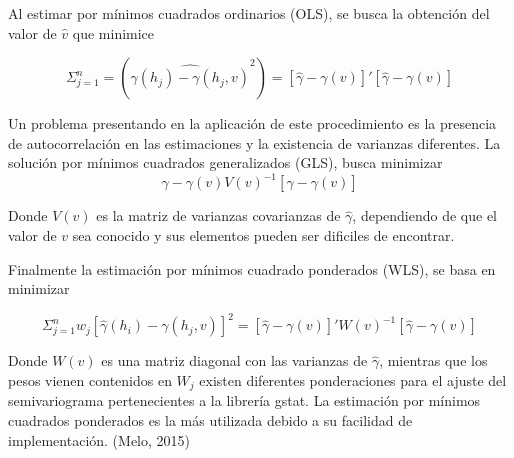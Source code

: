 Al estimar por mínimos cuadrados ordinarios (OLS), se busca la obtención del valor de $\hat{v}$ que minimice 

$$\Sigma_{j=1}^n = (\hat{\gamma(h_j) - \gamma(h_j, v)}^2) = [\hat{\gamma} - \gamma(v)]' [\hat{\gamma}-\gamma(v)]$$

Un problema presentando en la aplicación de este procedimiento es la presencia de autocorrelación en
las estimaciones y la existencia de varianzas diferentes. La solución por mínimos cuadrados
generalizados (GLS), busca minimizar
$$\hat{\gamma}-\gamma(v) V(v)^{-1}[\hat{\gamma}-\gamma(v)]$$

Donde $V(v)$ es la matriz de varianzas covarianzas de $\hat{\gamma}$, dependiendo de que el valor de $v$ sea conocido y sus elementos pueden ser dificiles de encontrar. 

Finalmente la estimación por mínimos cuadrado ponderados (WLS), se basa en minimizar 

$$\Sigma_{j=1}^n w_j[\hat{\gamma}(h_i) - \gamma(h_j,v)]^2 = [\hat{\gamma}-\gamma(v)]' W(v)^{-1}[\hat{\gamma}-\gamma(v)]$$

Donde $W(v)$ es una matriz diagonal con las varianzas de $\hat{\gamma}$, mientras que los pesos vienen
contenidos en $W_j$ existen diferentes ponderaciones para el ajuste del semivariograma pertenecientes a
la librería gstat. La estimación por mínimos cuadrados ponderados es la más utilizada debido a su
facilidad de implementación. (Melo, 2015)\cite{melo_2015}




